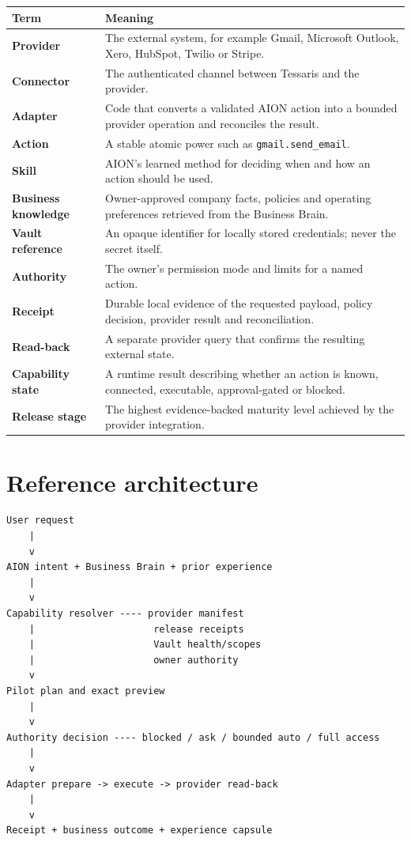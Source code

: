 \documentclass[11pt,a4paper]{article}
\newcommand{\code}[1]{\texttt{#1}}
\begin{document}
\begin{longtable}{>{\bfseries}p{34mm}p{118mm}}
\toprule
Term & Meaning \\
\midrule
Provider & The external system, for example Gmail, Microsoft Outlook, Xero, HubSpot, Twilio or Stripe. \\
Connector & The authenticated channel between Tessaris and the provider. \\
Adapter & Code that converts a validated AION action into a bounded provider operation and reconciles the result. \\
Action & A stable atomic power such as \code{gmail.send\_email}. \\
Skill & AION's learned method for deciding when and how an action should be used. \\
Business knowledge & Owner-approved company facts, policies and operating preferences retrieved from the Business Brain. \\
Vault reference & An opaque identifier for locally stored credentials; never the secret itself. \\
Authority & The owner's permission mode and limits for a named action. \\
Receipt & Durable local evidence of the requested payload, policy decision, provider result and reconciliation. \\
Read-back & A separate provider query that confirms the resulting external state. \\
Capability state & A runtime result describing whether an action is known, connected, executable, approval-gated or blocked. \\
Release stage & The highest evidence-backed maturity level achieved by the provider integration. \\
\bottomrule
\end{longtable}

\section{Reference architecture}

\begin{tcolorbox}[colback=AionPale,colframe=AionRule,boxrule=0.6pt]
\begin{verbatim}
User request
    |
    v
AION intent + Business Brain + prior experience
    |
    v
Capability resolver ---- provider manifest
    |                     release receipts
    |                     Vault health/scopes
    |                     owner authority
    v
Pilot plan and exact preview
    |
    v
Authority decision ---- blocked / ask / bounded auto / full access
    |
    v
Adapter prepare -> execute -> provider read-back
    |
    v
Receipt + business outcome + experience capsule
\end{verbatim}
\end{tcolorbox}
\end{document}

